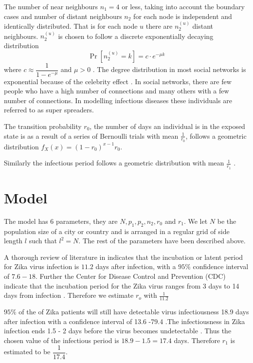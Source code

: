 The number of near neighbours $n_1 = 4$ or less, taking into account the boundary cases and number of distant neighbours $n_2$  for each node is independent and  identically distributed. That is for each node $u$ there are $n_2^ {(u)}$ distant neighbours. $n_2^ {(u)} $ is chosen to follow a discrete exponentially decaying distribution 
\begin{equation} 
 \Pr[n_2^{(u)} = k] = c \cdot e^{-\mu k  } \label{5.2.1}
 \end{equation}
 where $c \approx \dfrac{1}{1- e^{-\mu }}$ and $\mu >0$ \citep{fu2013propagation}.
 The degree distribution in most social networks is exponential because of the celebrity effect \citep{estrada2015first}. In social networks, there are few people who have a high number of connections and many others with a few number of connections. In modelling infectious diseases these individuals are referred to as super spreaders.

 The transition probability $r_0$, the number of days an individual is in the exposed state is as a result of a series of Bernoulli trials with mean $\frac{1}{r_0}$, follows a geometric distribution $f_X (x) = (1-r_0) ^ {x-1} r_0$.

 Similarly the infectious period follows a geometric distribution with mean $\frac{1}{r_1}$ \citep{fu2013propagation}.

\section{Model}
The model has 6 parameters, they are $N, p_1, p_2, n_2, r_0$ and $r_1$. We let $N$ be the population size of a city or country and is arranged in a regular grid of side length $l $ such that $l^2 = N$. The rest of the parameters have been described above.

A thorough review of literature in \cite{lessler2016times} indicates that the incubation or latent period for Zika virus infection is $11.2$ days after infection, with a $95 \%$ confidence interval of $7.6 -18$. Further the Center for Disease Control and Prevention (CDC) indicate that the incubation period for the Zika virus ranges from 3 days to 14 days from infection \citep{krow2017estimated}. Therefore we estimate $r_o$ with $\frac{1}{11.2}$
  
    $95\%$ of the of Zika patients will still have detectable virus infectiousness 18.9 days after infection with a confidence interval of 13.6 -79.4 \citep{lessler2016times}.The infectiousness in Zika infection ends 1.5 - 2 days before the virus becomes undetectable \citep{funk2016comparative}. Thus the chosen value of the infectious period is $18.9 - 1.5 = 17.4$ days. Therefore $r_1$ is estimated to be $\dfrac{1}{17.4}$.

